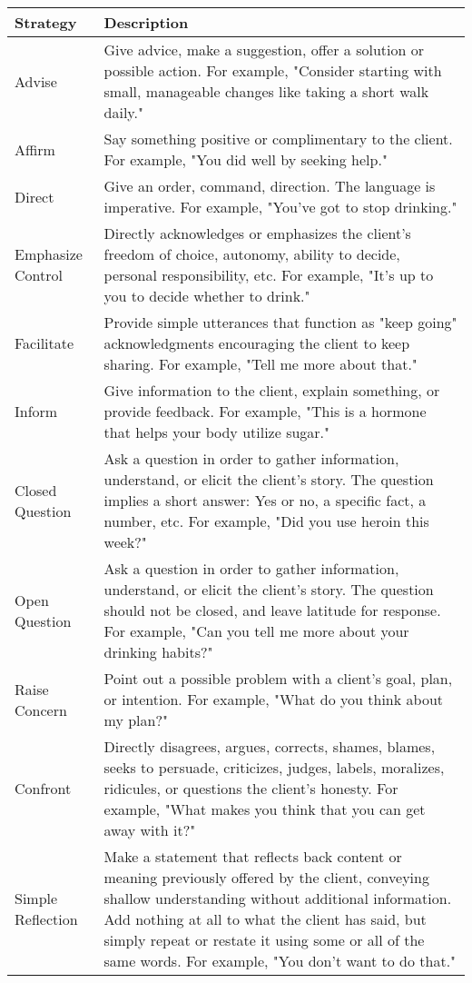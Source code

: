 \begin{table*}[tb]
\centering
\begin{tabularx}{\textwidth}{lX}
\toprule
Strategy            & Description                                            \\ \midrule
Advise & Give advice, make a suggestion, offer a solution or possible action. For example, "Consider starting with small, manageable changes like taking a short walk daily." \\ \hline
Affirm & Say something positive or complimentary to the client. For example, "You did well by seeking help." \\ \hline
Direct & Give an order, command, direction. The language is imperative. For example, "You’ve got to stop drinking." \\ \hline
Emphasize Control & Directly acknowledges or emphasizes the client's freedom of choice, autonomy, ability to decide, personal responsibility, etc. For example, "It’s up to you to decide whether to drink." \\ \hline
Facilitate & Provide simple utterances that function as "keep going" acknowledgments encouraging the client to keep sharing. For example, "Tell me more about that." \\ \hline
Inform & Give information to the client, explain something, or provide feedback. For example, "This is a hormone that helps your body utilize sugar." \\ \hline
Closed Question & Ask a question in order to gather information, understand, or elicit the client's story. The question implies a short answer: Yes or no, a specific fact, a number, etc. For example, "Did you use heroin this week?" \\ \hline
Open Question & Ask a question in order to gather information, understand, or elicit the client's story. The question should not be closed, and leave latitude for response. For example, "Can you tell me more about your drinking habits?" \\ \hline
Raise Concern & Point out a possible problem with a client's goal, plan, or intention. For example, "What do you think about my plan?" \\ \hline
Confront & Directly disagrees, argues, corrects, shames, blames, seeks to persuade, criticizes, judges, labels, moralizes, ridicules, or questions the client's honesty. For example, "What makes you think that you can get away with it?" \\ \hline
Simple Reflection & Make a statement that reflects back content or meaning previously offered by the client, conveying shallow understanding without additional information. Add nothing at all to what the client has said, but simply repeat or restate it using some or all of the same words. For example, "You don’t want to do that." \\ \hline

\end{tabularx}
\end{table*}
